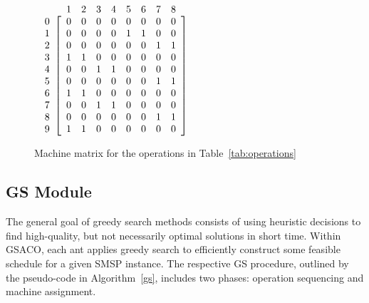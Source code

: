 \documentclass[runningheads]{llncs}
\begin{document}
\begin{figure}[h]
	\centering 
	$\begin{array}{c@{}c}
		& \begin{array}{cccccccc} 1 & 2 & 3 & 4 & 5 & 6 & 7 & 8  \end{array} \\
		\begin{array}{c} 0 \\ 1 \\ 2 \\ 3 \\ 4 \\ 5 \\ 6 \\ 7 \\ 8 \\ 9 \end{array} &
		\left[\begin{array}{cccccccccc}
			0 & 0 & 0 & 0 & 0 & 0 & 0 & 0 \\
			0 & 0 & 0 & 0 & 1 & 1 & 0 & 0 \\
			0 & 0 & 0 & 0 & 0 & 0 & 1 & 1 \\
			1 & 1 & 0 & 0 & 0 & 0 & 0 & 0 \\
			0 & 0 & 1 & 1 & 0 & 0 & 0 & 0 \\
			0 & 0 & 0 & 0 & 0 & 0 & 1 & 1 \\
			1 & 1 & 0 & 0 & 0 & 0 & 0 & 0 \\
			0 & 0 & 1 & 1 & 0 & 0 & 0 & 0 \\
			0 & 0 & 0 & 0 & 0 & 0 & 1 & 1 \\
			1 & 1 & 0 & 0 & 0 & 0 & 0 & 0 \\
		\end{array}\right]
	\end{array}$
	\caption{Machine matrix for the operations in Table~\ref{tab:operations}}
	\label{fig:c}
\end{figure}

\subsection{GS Module}

The general goal of greedy search methods consists of using heuristic decisions
to find high-quality, but not necessarily optimal solutions in short time.
Within GSACO, each ant applies greedy search to efficiently construct some
feasible schedule for a given SMSP instance.
The respective GS procedure, outlined by the pseudo-code in Algorithm~\ref{gs},
includes two phases: 
operation sequencing and machine assignment.
%
\end{document}
